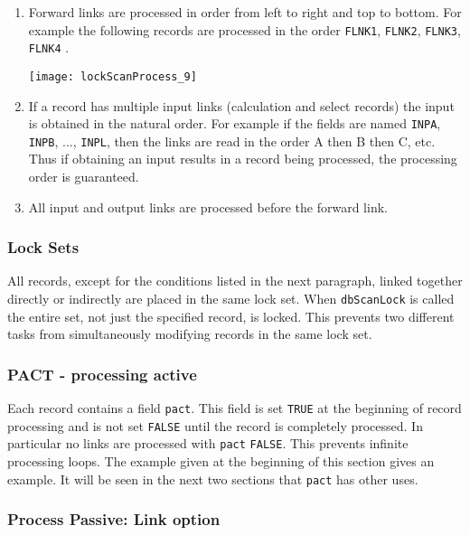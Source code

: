 \begin{enumerate}
\item Forward links are processed in order from left to right and top to bottom. For example the following records are 
processed in the order \verb|FLNK1|, \verb|FLNK2|, \verb|FLNK3|, \verb|FLNK4| .

\begin{center}
\texttt{[image: lockScanProcess\_9]}
\end{center}

\item If a record has multiple input links (calculation and select records) the input is obtained in the natural order. For 
example if the fields are named \verb|INPA|, \verb|INPB|, ..., \verb|INPL|, then the links are read in the order A then B then C, etc. 
Thus if obtaining an input results in a record being processed, the processing order is guaranteed.

\item All input and output links are processed before the forward link.

\end{enumerate}

\subsubsection{Lock Sets}

All records, except for the conditions listed in the next paragraph, linked together directly or indirectly are placed in the 
same lock set. When \verb|dbScanLock| is called the entire set, not just the specified record, is locked. This prevents two 
different tasks from simultaneously modifying records in the same lock set.

\subsubsection{PACT - processing active}

Each record contains a field \verb|pact|. This field is set \verb|TRUE| at the beginning of record processing and is not set \verb|FALSE| until 
the record is completely processed. In particular no links are processed with \verb|pact| \verb|FALSE|. This prevents infinite 
processing loops. The example given at the beginning of this section gives an example. It will be seen in the next two 
sections that \verb|pact| has other uses.

\subsubsection{Process Passive: Link option}


